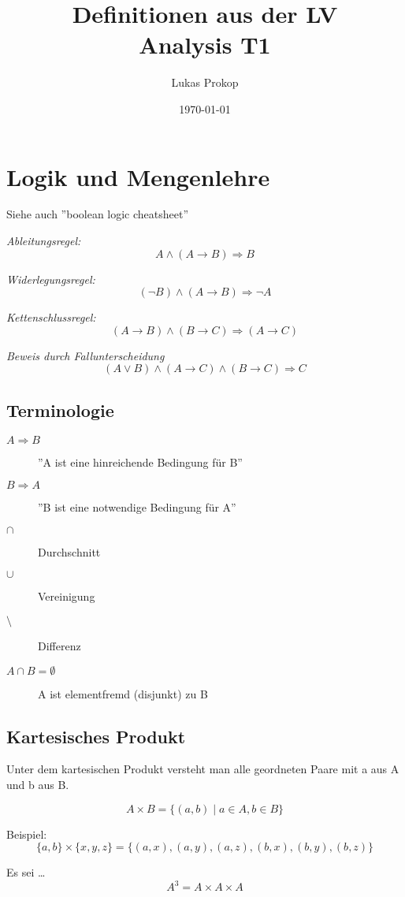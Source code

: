 \documentclass[11pt,a4paper,twocolumn]{article}
\title{Definitionen aus der LV \\ Analysis T1}
\author{Lukas Prokop}
\date{\today}
\newcommand{\set}[1]{{\Big\{}#1{\Big\}}}
\newcommand{\ra}{\rightarrow}
\newcommand{\Ra}{\Rightarrow}
\theoremstyle{area}
\begin{document}
\maketitle

\section{Logik und Mengenlehre}

\small{Siehe auch ''boolean logic cheatsheet''}

\emph{Ableitungsregel:}
\[
    A \land (A \ra B) \Ra B
\]

\emph{Widerlegungsregel:}
\[
    (\neg B) \land (A \ra B) \Ra \neg A
\]

\emph{Kettenschlussregel:}
\[
    (A \ra B) \land (B \ra C) \Ra (A \ra C)
\]

\emph{Beweis durch Fallunterscheidung}
\[
    (A \lor B) \land (A \ra C) \land (B \ra C) \Ra C
\]

\subsection{Terminologie}

\begin{description}
  \item[$A \Ra B$]
    ''A ist eine hinreichende Bedingung für B''
  \item[$B \Ra A$]
    ''B ist eine notwendige Bedingung für A''
  \item[$\cap$]
    Durchschnitt
  \item[$\cup$]
    Vereinigung
  \item[$\setminus$]
    Differenz
  \item[$A \cap B = \emptyset$]
    A ist elementfremd (disjunkt) zu B
\end{description}

\subsection{Kartesisches Produkt}

Unter dem kartesischen Produkt versteht man alle geordneten Paare mit
a aus A und b aus B.

\[
    A \times B = \set{ (a,b) \mid a \in A, b \in B }
\]

Beispiel:
\[
    \set{a,b} \times \set{x,y,z}
        = \set{(a,x), (a,y), (a,z), (b,x), (b,y), (b,z)}
\]

Es sei \dots
\[
    A^3 = A \times A \times A
\]
\end{document}
